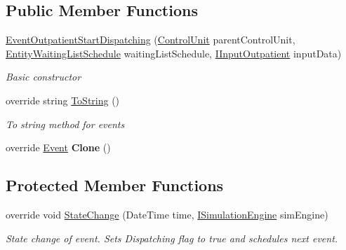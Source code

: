 \subsection*{Public Member Functions}
\begin{DoxyCompactItemize}
\item 
\hyperlink{class_general_health_care_elements_1_1_department_models_1_1_outpatient_1_1_waiting_list_1_1_event_outpatient_start_dispatching_a177296b186c53e9397dd2302cdc9981f}{Event\+Outpatient\+Start\+Dispatching} (\hyperlink{class_simulation_core_1_1_h_c_c_m_elements_1_1_control_unit}{Control\+Unit} parent\+Control\+Unit, \hyperlink{class_general_health_care_elements_1_1_booking_models_1_1_entity_waiting_list_schedule}{Entity\+Waiting\+List\+Schedule} waiting\+List\+Schedule, \hyperlink{interface_general_health_care_elements_1_1_department_models_1_1_outpatient_1_1_i_input_outpatient}{I\+Input\+Outpatient} input\+Data)
\begin{DoxyCompactList}\small\item\em Basic constructor \end{DoxyCompactList}\item 
override string \hyperlink{class_general_health_care_elements_1_1_department_models_1_1_outpatient_1_1_waiting_list_1_1_event_outpatient_start_dispatching_aad8feeb4160a1354d57350b8a290abe3}{To\+String} ()
\begin{DoxyCompactList}\small\item\em To string method for events \end{DoxyCompactList}\item 
override \hyperlink{class_simulation_core_1_1_h_c_c_m_elements_1_1_event}{Event} {\bfseries Clone} ()\hypertarget{class_general_health_care_elements_1_1_department_models_1_1_outpatient_1_1_waiting_list_1_1_event_outpatient_start_dispatching_a88d7a8430dc862ad431acd70de6a5e3a}{}\label{class_general_health_care_elements_1_1_department_models_1_1_outpatient_1_1_waiting_list_1_1_event_outpatient_start_dispatching_a88d7a8430dc862ad431acd70de6a5e3a}

\end{DoxyCompactItemize}
\subsection*{Protected Member Functions}
\begin{DoxyCompactItemize}
\item 
override void \hyperlink{class_general_health_care_elements_1_1_department_models_1_1_outpatient_1_1_waiting_list_1_1_event_outpatient_start_dispatching_a879e4314240f399558aab154930c4685}{State\+Change} (Date\+Time time, \hyperlink{interface_simulation_core_1_1_simulation_classes_1_1_i_simulation_engine}{I\+Simulation\+Engine} sim\+Engine)
\begin{DoxyCompactList}\small\item\em State change of event. Sets Dispatching flag to true and schedules next event. \end{DoxyCompactList}\end{DoxyCompactItemize}
